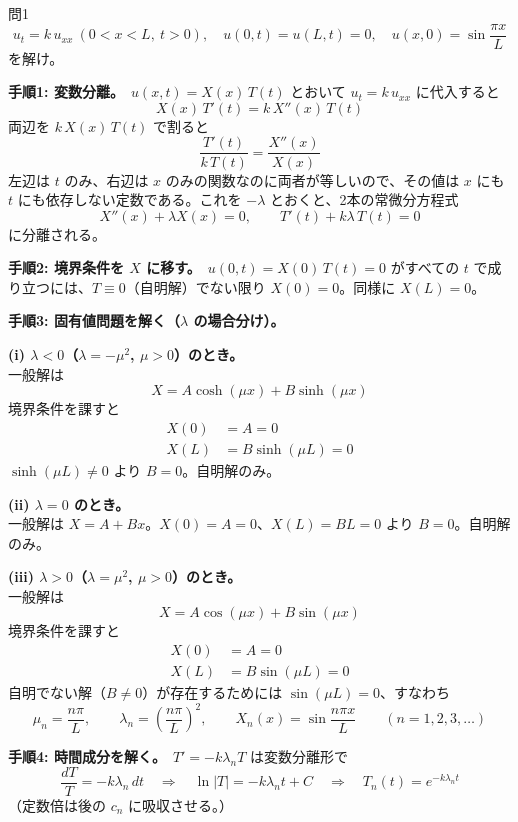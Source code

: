 \documentclass[a4paper,11pt]{article}
\begin{document}
\clearpage
\begin{mondaiboxS}{問1}
\[
u_t = k\,u_{xx}\ (0<x<L,\ t>0), \quad u(0,t)=u(L,t)=0, \quad u(x,0) = \sin\frac{\pi x}{L}
\]
を解け。
\end{mondaiboxS}
\kaitou
\textbf{手順1: 変数分離。}\ $u(x,t) = X(x)\,T(t)$ とおいて $u_t = k\,u_{xx}$ に代入すると
\[
X(x)\,T'(t) = k\,X''(x)\,T(t)
\]
両辺を $k\,X(x)\,T(t)$ で割ると
\[
\frac{T'(t)}{k\,T(t)} = \frac{X''(x)}{X(x)}
\]
左辺は $t$ のみ、右辺は $x$ のみの関数なのに両者が等しいので、その値は $x$ にも $t$ にも依存しない定数である。これを $-\lambda$ とおくと、2本の常微分方程式
\[
X''(x) + \lambda X(x) = 0, \qquad T'(t) + k\lambda\,T(t) = 0
\]
に分離される。

\textbf{手順2: 境界条件を $X$ に移す。}\ $u(0,t) = X(0)\,T(t) = 0$ がすべての $t$ で成り立つには、$T \equiv 0$（自明解）でない限り $X(0) = 0$。同様に $X(L) = 0$。

\textbf{手順3: 固有値問題を解く（$\lambda$ の場合分け）。}

\textbf{(i) $\lambda < 0$（$\lambda = -\mu^{2}$, $\mu>0$）のとき。}\\
一般解は
\[
X = A\cosh(\mu x) + B\sinh(\mu x)
\]
境界条件を課すと
\begin{align*}
X(0) &= A = 0 \\
X(L) &= B\sinh(\mu L) = 0
\end{align*}
$\sinh(\mu L) \neq 0$ より $B = 0$。自明解のみ。

\textbf{(ii) $\lambda = 0$ のとき。}\\
一般解は $X = A + Bx$。$X(0) = A = 0$、$X(L) = BL = 0$ より $B = 0$。自明解のみ。

\textbf{(iii) $\lambda > 0$（$\lambda = \mu^{2}$, $\mu>0$）のとき。}\\
一般解は
\[
X = A\cos(\mu x) + B\sin(\mu x)
\]
境界条件を課すと
\begin{align*}
X(0) &= A = 0 \\
X(L) &= B\sin(\mu L) = 0
\end{align*}
自明でない解（$B \neq 0$）が存在するためには $\sin(\mu L) = 0$、すなわち
\[
\mu_n = \frac{n\pi}{L}, \qquad \lambda_n = \left(\frac{n\pi}{L}\right)^{2}, \qquad X_n(x) = \sin\frac{n\pi x}{L} \qquad (n = 1, 2, 3, \dots)
\]

\textbf{手順4: 時間成分を解く。}\ $T' = -k\lambda_n T$ は変数分離形で
\[
\frac{dT}{T} = -k\lambda_n\,dt
\quad\Longrightarrow\quad
\ln|T| = -k\lambda_n t + C
\quad\Longrightarrow\quad
T_n(t) = e^{-k\lambda_n t}
\]
（定数倍は後の $c_n$ に吸収させる。）
\end{document}
